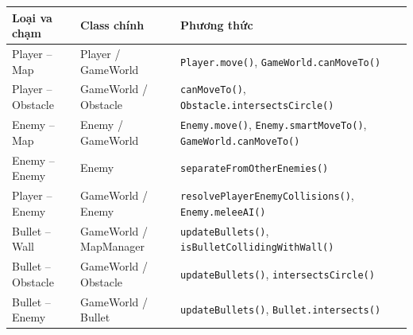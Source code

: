 \documentclass[12pt,a4paper]{report}
\begin{document}
    \begin{table}[htbp]
        \centering
        \small
        \renewcommand{\arraystretch}{1.4}
        \begin{tabular}{|p{3.2cm}|p{3.2cm}|p{6.5cm}|}
            \hline
            \textbf{Loại va chạm}
            &
            \textbf{Class chính}
            &
            \textbf{Phương thức}
            \\
            \hline

            Player -- Map
            &
            Player / GameWorld
            &
            \texttt{Player.move()},
            \texttt{GameWorld.canMoveTo()}
            \\
            \hline

            Player -- Obstacle
            &
            GameWorld / Obstacle
            &
            \texttt{canMoveTo()},
            \texttt{Obstacle.intersectsCircle()}
            \\
            \hline

            Enemy -- Map
            &
            Enemy / GameWorld
            &
            \texttt{Enemy.move()},
            \texttt{Enemy.smartMoveTo()},
            \texttt{GameWorld.canMoveTo()}
            \\
            \hline

            Enemy -- Enemy
            &
            Enemy
            &
            \texttt{separateFromOtherEnemies()}
            \\
            \hline

            Player -- Enemy
            &
            GameWorld / Enemy
            &
            \texttt{resolvePlayerEnemyCollisions()},
            \texttt{Enemy.meleeAI()}
            \\
            \hline

            Bullet -- Wall
            &
            GameWorld / MapManager
            &
            \texttt{updateBullets()},
            \texttt{isBulletCollidingWithWall()}
            \\
            \hline

            Bullet -- Obstacle
            &
            GameWorld / Obstacle
            &
            \texttt{updateBullets()},
            \texttt{intersectsCircle()}
            \\
            \hline

            Bullet -- Enemy
            &
            GameWorld / Bullet
            &
            \texttt{updateBullets()},
            \texttt{Bullet.intersects()}
            \\
            \hline


\end{tabular}
\end{table}
\end{document}
